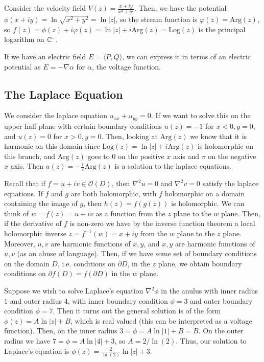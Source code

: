\begin{example}
    Consider the velocity field $V(z) = \frac{x+iy}{x^2+y^2}$. Then, we have the potential $\phi(x+iy) = \ln\sqrt{x^2+y^2} = \ln|z|$, so the stream function is $\varphi(z) = \text{Arg}(z)$, so $f(z) = \phi(z)+i\varphi(z) = \ln|z|+i\text{Arg}(z) = \text{Log}(z)$ is the principal logarithm on $\mathbb C^-$. 
\end{example}


If we have an electric field $E = \langle P,Q\rangle$, we can express it in terms of an electric potential as $E = -\nabla \alpha$ for $\alpha$, the voltage function. 

\subsection{The Laplace Equation}

We consider the laplace equation $u_{xx}+u_{yy} = 0$. If we want to solve this on the upper half plane with certain boundary conditions $u(z) = -1$ for $x < 0, y = 0$, and $u(z) = 0$ for $x > 0, y = 0$. Then, looking at $\text{Arg}(z)$ we know that it is harmonic on this domain since $\text{Log}(z) = \ln|z| + i\text{Arg}(z)$ is holomorphic on this branch, and $\text{Arg}(z)$ goes to $0$ on the positive $x$ axis and $\pi$ on the negative $x$ axis. Then $u(z) = -\frac{1}{\pi}\text{Arg}(z)$ is a solution to the laplace equations. 

Recall that if $f=u+iv \in \mathcal{O}(D)$, then $\nabla^2u = 0$ and $\nabla^2v = 0$ satisfy the laplace equations. If $f$ and $g$ are both holomorphic, with $f$ holomorphic on a domain containing the image of $g$, then $h(z) = f(g(z))$ is holomorphic. We can think of $w = f(z) = u+iv$ as a function from the $z$ plane to the $w$ plane. Then, if the derivative of $f$ is non-zero we have by the inverse function theorem a local holomorphic inverse $z = f^{-1}(w) = x+iy$ from the $w$ plane to the $z$ plane. Moreover, $u,v$ are harmonic functions of $x,y$, and $x,y$ are harmonic functions of $u,v$ (as an abuse of language). Then, if we have some set of boundary conditions on the domain $D$, i.e. conditions on $\partial D$, in the $z$ plane, we obtain boundary conditions on $\partial f(D) = f(\partial D)$ in the $w$ plane.

\begin{example}
    Suppose we wish to solve Laplace's equation $\nabla^2\phi$ in the anulus with inner radius $1$ and outer radius $4$, with inner boundary condition $\phi = 3$ and outer boundary condition $\phi = 7$. Then it turns out the general solution is of the form $\phi(z) = A\ln|z| +B$, which is real valued (this can be interpreted as a voltage function). Then, on the inner radius $3 = \phi = A\ln|1| + B = B$. On the outer radius we have $7 = \phi = A\ln|4| + 3$, so $A = 2/\ln(2)$. Thus, our solution to Laplace's equation is $\phi(z) = \frac{2}{\ln(2)}\ln|z| + 3$.
\end{example}

